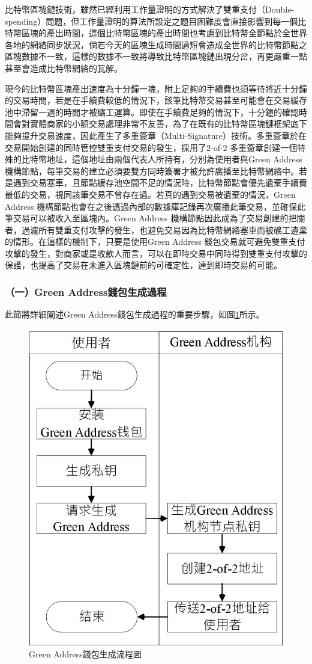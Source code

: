 			 	比特幣區塊鏈技術，雖然已經利用工作量證明的方式解決了雙重支付（Double-spending）問題\supercite{Informationpropagationinthebitcoinnetwork}\supercite{Double-spendingfastpaymentsinbitcoin}，但工作量證明的算法所設定之題目困難度會直接影響到每一個比特幣區塊的產出時間，這個比特幣區塊的產出時間也考慮到比特幣全節點於全世界各地的網絡同步狀況，倘若今天的區塊生成時間過短會造成全世界的比特幣節點之區塊數據不一致，這樣的數據不一致將導致比特幣區塊鏈出現分岔，再更嚴重一點甚至會造成比特幣網絡的瓦解。

			 	現今的⽐特幣區塊產出速度為⼗分鐘⼀塊，附上⾜夠的⼿續費也須等待將近⼗分鐘的交易時間，若是在⼿續費較低的情況下，該筆⽐特幣交易甚⾄可能會在交易緩存池中滯留⼀週的時間才被礦工運算。即使在⼿續費⾜夠的情況下，⼗分鐘的確認時間會對實體商家的⼩額交易處理⾮常不友善，為了在既有的⽐特幣區塊鏈框架底下能夠提升交易速度，因此產生了多重簽章（Multi-Signature）技術。多重簽章於在交易開始創建的同時管控雙重⽀付交易的發⽣，採⽤了2-of-2 多重簽章創建⼀個特殊的⽐特幣地址，這個地址由兩個代表⼈所持有，分別為使⽤者與Green Address\supercite{GreenAddress}機構節點，每筆交易的建⽴必須要雙⽅同時簽署才被允許廣播⾄⽐特幣網絡中。若是遇到交易塞⾞，且節點緩存池空間不⾜的情況時，⽐特幣節點會優先遺棄⼿續費最低的交易，視同該筆交易不曾存在過。若真的遇到交易被遺棄的情況，Green Address 機構節點也會在之後透過內部的數據庫記錄再次廣播此筆交易，並確保此筆交易可以被收⼊⾄區塊內。Green Address 機構節點因此成為了交易創建的把關者，過濾所有雙重⽀付攻擊的發⽣，也避免交易因為⽐特幣網絡塞⾞⽽被礦⼯遺棄的情形。在這樣的機制下，只要是使⽤Green Address 錢包交易就可避免雙重⽀付攻擊的發⽣，對商家或是收款⼈⽽⾔，可以在即時交易中同時得到雙重⽀付攻擊的保護，也提高了交易在未進⼊區塊鏈前的可確定性，達到即時交易的可能。

			 	\subsubsection{（一）Green Address錢包生成過程}
			 	此節將詳細闡述Green Address錢包生成過程的重要步驟，如圖\ref{gabuild}所示。
			 	\begin{figure}[!htbp]
					\centering
					\includegraphics[width = .4\textwidth]{gabuild.jpg}
					\caption{Green Address錢包生成流程圖}\label{gabuild}
				\end{figure}

